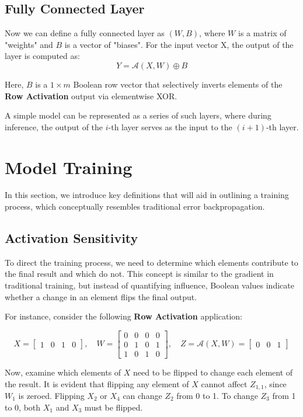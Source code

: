 \documentclass{article}
\theoremstyle{definition}
\theoremstyle{remark}
\begin{document}
\subsection{Fully Connected Layer}
Now we can define a fully connected layer as \( (W, B) \), where \( W \) is a matrix of "weights" and \( B \) is a vector of "biases". For the input vector X, the output of the layer is computed as:
\[ Y = \mathcal{A}(X, W) \oplus B \]

Here, \( B \) is a \( 1 \times m \) Boolean row vector that selectively inverts elements of the \textbf{Row Activation} output via elementwise XOR.

A simple model can be represented as a series of such layers, where during inference, the output of the \( i \)-th layer serves as the input to the \( (i+1) \)-th layer.

\section{Model Training}
In this section, we introduce key definitions that will aid in outlining a training process, which conceptually resembles traditional error backpropagation.

\subsection{Activation Sensitivity}
To direct the training process, we need to determine which elements contribute to the final result and which do not. This concept is similar to the gradient in traditional training, but instead of quantifying influence, Boolean values indicate whether a change in an element flips the final output.

For instance, consider the following \textbf{Row Activation} application:

\[
    X = \begin{bmatrix} 1 & 0 & 1 & 0 \end{bmatrix},\quad
    W = \begin{bmatrix} 0 & 0 & 0 & 0 \\ 0 & 1 & 0 & 1 \\ 1 & 0 & 1 & 0 \end{bmatrix},\quad
    Z = \mathcal{A}\left( X, W \right) = \begin{bmatrix} 0 & 0 & 1 \end{bmatrix}
\]

Now, examine which elements of \( X \) need to be flipped to change each element of the result. It is evident that flipping any element of \( X \) cannot affect \( Z_{1,1} \), since \( W_1 \) is zeroed. Flipping \( X_2 \) or \( X_4 \) can change \( Z_2 \) from 0 to 1. To change \( Z_3 \) from 1 to 0, both \( X_1 \) and \( X_3 \) must be flipped.
\end{document}
